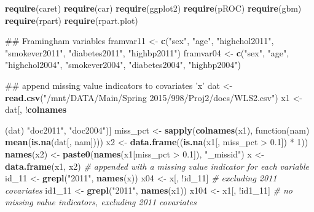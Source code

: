 \documentclass[11pt,]{article}
\newenvironment{Shaded}{\begin{snugshade}}{\end{snugshade}}
\newcommand{\KeywordTok}[1]{\textcolor[rgb]{0.13,0.29,0.53}{\textbf{{#1}}}}
\newcommand{\DecValTok}[1]{\textcolor[rgb]{0.00,0.00,0.81}{{#1}}}
\newcommand{\FloatTok}[1]{\textcolor[rgb]{0.00,0.00,0.81}{{#1}}}
\newcommand{\StringTok}[1]{\textcolor[rgb]{0.31,0.60,0.02}{{#1}}}
\newcommand{\CommentTok}[1]{\textcolor[rgb]{0.56,0.35,0.01}{\textit{{#1}}}}
\newcommand{\NormalTok}[1]{{#1}}
\begin{document}
\begin{Shaded}
\begin{Highlighting}[]
\KeywordTok{require}\NormalTok{(caret)}
\KeywordTok{require}\NormalTok{(car)}
\KeywordTok{require}\NormalTok{(ggplot2)}
\KeywordTok{require}\NormalTok{(pROC)}
\KeywordTok{require}\NormalTok{(gbm)}
\KeywordTok{require}\NormalTok{(rpart)}
\KeywordTok{require}\NormalTok{(rpart.plot)}

\NormalTok{## Framingham variables}
\NormalTok{framvar11 <-}\StringTok{ }\KeywordTok{c}\NormalTok{(}\StringTok{"sex"}\NormalTok{, }\StringTok{"age"}\NormalTok{, }\StringTok{"highchol2011"}\NormalTok{, }\StringTok{"smokever2011"}\NormalTok{, }\StringTok{"diabetes2011"}\NormalTok{, }
    \StringTok{"highbp2011"}\NormalTok{)}
\NormalTok{framvar04 <-}\StringTok{ }\KeywordTok{c}\NormalTok{(}\StringTok{"sex"}\NormalTok{, }\StringTok{"age"}\NormalTok{, }\StringTok{"highchol2004"}\NormalTok{, }\StringTok{"smokever2004"}\NormalTok{, }\StringTok{"diabetes2004"}\NormalTok{, }
    \StringTok{"highbp2004"}\NormalTok{)}

\NormalTok{## append missing value indicators to covariates 'x'}
\NormalTok{dat <-}\StringTok{ }\KeywordTok{read.csv}\NormalTok{(}\StringTok{"/mnt/DATA/Main/Spring 2015/998/Proj2/docs/WLS2.csv"}\NormalTok{)}
\NormalTok{x1 <-}\StringTok{ }\NormalTok{dat[, !}\KeywordTok{colnames}\NormalTok{(dat) %
    \StringTok{"doc2011"}\NormalTok{, }\StringTok{"doc2004"}\NormalTok{)]}
\NormalTok{miss_pct <-}\StringTok{ }\KeywordTok{sapply}\NormalTok{(}\KeywordTok{colnames}\NormalTok{(x1), function(nam) }\KeywordTok{mean}\NormalTok{(}\KeywordTok{is.na}\NormalTok{(dat[, nam])))}
\NormalTok{x2 <-}\StringTok{ }\KeywordTok{data.frame}\NormalTok{((}\KeywordTok{is.na}\NormalTok{(x1[, miss_pct >}\StringTok{ }\FloatTok{0.1}\NormalTok{]) *}\StringTok{ }\DecValTok{1}\NormalTok{))}
\KeywordTok{names}\NormalTok{(x2) <-}\StringTok{ }\KeywordTok{paste0}\NormalTok{(}\KeywordTok{names}\NormalTok{(x1[miss_pct >}\StringTok{ }\FloatTok{0.1}\NormalTok{]), }\StringTok{"_missid"}\NormalTok{)}
\NormalTok{x <-}\StringTok{ }\KeywordTok{data.frame}\NormalTok{(x1, x2)  }\CommentTok{# appended with a missing value indicator for each variable}
\NormalTok{id_11 <-}\StringTok{ }\KeywordTok{grepl}\NormalTok{(}\StringTok{"2011"}\NormalTok{, }\KeywordTok{names}\NormalTok{(x))}
\NormalTok{x04 <-}\StringTok{ }\NormalTok{x[, !id_11]  }\CommentTok{# excluding 2011 covariates}
\NormalTok{id1_11 <-}\StringTok{ }\KeywordTok{grepl}\NormalTok{(}\StringTok{"2011"}\NormalTok{, }\KeywordTok{names}\NormalTok{(x1))}
\NormalTok{x104 <-}\StringTok{ }\NormalTok{x1[, !id1_11]  }\CommentTok{# no missing value indicators, excluding 2011 covariates}

}
\end{Highlighting}
\end{Shaded}
\end{document}
